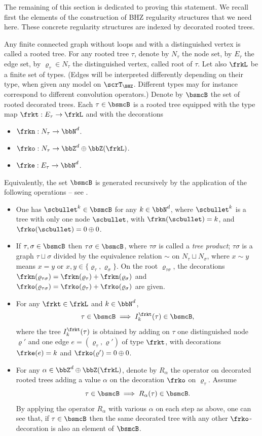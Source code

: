 The remaining of this section is dedicated to proving this statement. We recall first the elements of the construction of BHZ regularity structures that we need here. These concrete regularity structures are indexed by decorated rooted trees.

Any finite connected graph without loops and with a distinguished vertex is called a rooted tree. For any rooted tree $\tau$, denote by $N_\tau$ the node set, by $E_\tau$ the edge set, by $\varrho_\tau\in N_\tau$ the distinguished vertex, called root of $\tau$. Let also $\frkL$ be a finite set of types. (Edges will be interpreted differently depending on their type, when given any model on $\scrT_{\BHZ}$. Different types may for instance correspond to different convolution operators.) Denote by $\bsmcB$ the set of rooted decorated trees. Each $\tau\in\bsmcB$ is a rooted tree equipped with the type map $\frkt:E_\tau\to\frkL$ and with the decorations
\begin{itemize}
\item $\frkn:N_\tau\to\bbN^d$.
\item $\frko:N_\tau\to\bbZ^d\oplus\bbZ(\frkL)$.
\item $\frke:E_\tau\to\bbN^d$.
\end{itemize}
Equivalently, the set $\bsmcB$ is generated recursively by the application of the following operations -- see \cite[\S 4.3]{BHZ}.
\begin{itemize}
\item One has $\scbullet^k\in\bsmcB$ for any $k\in\bbN^d$, where $\scbullet^k$ is a tree with only one node $\scbullet$, with $\frkn(\scbullet)=k$, and $\frko(\scbullet)=0\oplus0$.
\item If $\tau,\sigma\in\bsmcB$ then $\tau\sigma\in\bsmcB$, where $\tau\sigma$ is called a \emph{tree product}; $\tau\sigma$ is a graph $\tau\sqcup\sigma$ divided by the equivalence relation $\sim$ on $N_\tau\sqcup N_\sigma$, where $x\sim y$ means $x=y$ or $x,y\in\{\varrho_\tau,\varrho_\sigma\}$. On the root $\varrho_{\tau\sigma}$, the decorations $\frkn(\varrho_{\tau\sigma})=\frkn(\varrho_\tau)+\frkn(\varrho_\sigma)$ and $\frko(\varrho_{\tau\sigma})=\frko(\varrho_\tau)+\frko(\varrho_\sigma)$ are given.
\item For any $\frkt\in\frkL$ and $k\in\bbN^d$,
\[
\tau\in\bsmcB\implies I_k^\frkt(\tau)\in\bsmcB,
\]
where the tree $I_k^\frkt(\tau)$ is obtained by adding on $\tau$ one distinguished node $\varrho'$ and one edge $e=(\varrho_\tau,\varrho')$ of type $\frkt$, with decorations $\frke(e)=k$ and $\frko(\varrho')=0\oplus0$.
\item For any $\alpha\in\bbZ^d\oplus\bbZ(\frkL)$, denote by $R_\alpha$ the operator on decorated rooted trees adding a value $\alpha$ on the decoration $\frko$ on $\varrho_\tau$. Assume
\[
\tau\in\bsmcB \implies R_\alpha(\tau)\in\bsmcB.
\]
By applying the operator $R_\alpha$ with various $\alpha$ on each step as above, one can see that, if $\tau\in\bsmcB$ then the same decorated tree with any other $\frko$-decoration is also an element of $\bsmcB$.
\end{itemize}

